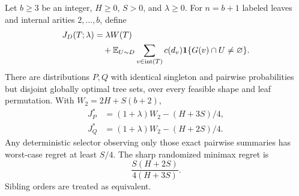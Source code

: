 \begin{theorem}\label{thm:pairwise-optimum}
Let $b\ge3$ be an integer, $H\ge0$, $S>0$, and $\lambda\ge0$.
For $n=b+1$ labeled leaves and internal arities $2,\ldots,b$, define
\begin{align*}
 J_D(T;\lambda)&=\lambda W(T)\\
 &\quad+\mathbb E_{U\sim D}\sum_{v\in\operatorname{int}(T)}c(d_v)
       \mathbf 1\{G(v)\cap U\ne\varnothing\}.
\end{align*}
There are distributions $P,Q$ with identical singleton and pairwise
probabilities but disjoint globally optimal tree sets, over every feasible
shape and leaf permutation. With $W_2=2H+S(b+2)$,
\begin{align}
 J_P^*&=(1+\lambda)W_2-(H+3S)/4,\label{eq:general-p}\\
 J_Q^*&=(1+\lambda)W_2-(H+2S)/4.\label{eq:general-q}
\end{align}
Any deterministic selector observing only those exact pairwise summaries has
worst-case regret at least $S/4$. The sharp randomized minimax regret is
\begin{equation}\label{eq:minimax-pairwise}
 \frac{S(H+2S)}{4(H+3S)}.
\end{equation}
Sibling orders are treated as equivalent.
\end{theorem}

